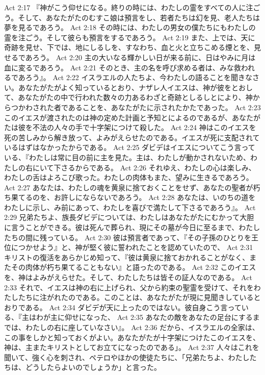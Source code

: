 Act 2:17  『神がこう仰せになる。終りの時には、わたしの霊をすべての人に注ごう。そして、あなたがたのむすこ娘は預言をし、若者たちは幻を見、老人たちは夢を見るであろう。
Act 2:18  その時には、わたしの男女の僕たちにもわたしの霊を注ごう。そして彼らも預言をするであろう。
Act 2:19  また、上では、天に奇跡を見せ、下では、地にしるしを、すなわち、血と火と立ちこめる煙とを、見せるであろう。
Act 2:20  主の大いなる輝かしい日が来る前に、日はやみに月は血に変るであろう。
Act 2:21  そのとき、主の名を呼び求める者は、みな救われるであろう』。
Act 2:22  イスラエルの人たちよ、今わたしの語ることを聞きなさい。あなたがたがよく知っているとおり、ナザレ人イエスは、神が彼をとおして、あなたがたの中で行われた数々の力あるわざと奇跡としるしとにより、神からつかわされた者であることを、あなたがたに示されたかたであった。
Act 2:23  このイエスが渡されたのは神の定めた計画と予知とによるのであるが、あなたがたは彼を不法の人々の手で十字架につけて殺した。
Act 2:24  神はこのイエスを死の苦しみから解き放って、よみがえらせたのである。イエスが死に支配されているはずはなかったからである。
Act 2:25  ダビデはイエスについてこう言っている、『わたしは常に目の前に主を見た。主は、わたしが動かされないため、わたしの右にいて下さるからである。
Act 2:26  それゆえ、わたしの心は楽しみ、わたしの舌はよろこび歌った。わたしの肉体もまた、望みに生きるであろう。
Act 2:27  あなたは、わたしの魂を黄泉に捨ておくことをせず、あなたの聖者が朽ち果てるのを、お許しにならないであろう。
Act 2:28  あなたは、いのちの道をわたしに示し、み前にあって、わたしを喜びで満たして下さるであろう』。
Act 2:29  兄弟たちよ、族長ダビデについては、わたしはあなたがたにむかって大胆に言うことができる。彼は死んで葬られ、現にその墓が今日に至るまで、わたしたちの間に残っている。
Act 2:30  彼は預言者であって、『その子孫のひとりを王位につかせよう』と、神が堅く彼に誓われたことを認めていたので、
Act 2:31  キリストの復活をあらかじめ知って、『彼は黄泉に捨ておかれることがなく、またその肉体が朽ち果てることもない』と語ったのである。
Act 2:32  このイエスを、神はよみがえらせた。そして、わたしたちは皆その証人なのである。
Act 2:33  それで、イエスは神の右に上げられ、父から約束の聖霊を受けて、それをわたしたちに注がれたのである。このことは、あなたがたが現に見聞きしているとおりである。
Act 2:34  ダビデが天に上ったのではない。彼自身こう言っている、『主はわが主に仰せになった、
Act 2:35  あなたの敵をあなたの足台にするまでは、わたしの右に座していなさい』。
Act 2:36  だから、イスラエルの全家は、この事をしかと知っておくがよい。あなたがたが十字架につけたこのイエスを、神は、主またキリストとしてお立てになったのである」。
Act 2:37  人々はこれを聞いて、強く心を刺され、ペテロやほかの使徒たちに、「兄弟たちよ、わたしたちは、どうしたらよいのでしょうか」と言った。
